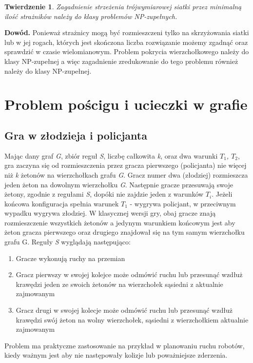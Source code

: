 \documentclass[brudnopis]{xmgr}
\newtheorem{Twierdzenie}{Twierdzenie}
\begin{document}
\begin{Twierdzenie}
	Zagadnienie strzeżenia trójwymiarowej siatki przez minimalną ilość strażników należy do klasy problemów NP-zupełnych.
\end{Twierdzenie}
\textbf{Dowód.} Ponieważ strażnicy mogą być rozmieszczeni tylko na skrzyżowania siatki lub w jej rogach, których jest skończona liczba rozwiązanie możemy zgadnąć oraz sprawdzić w czasie wielomianowym. Problem pokrycia wierzchołkowego należy do klasy NP-zupełnej a więc zagadnienie zredukowanie do tego problemu również należy do klasy NP-zupełnej.

\chapter{Problem pościgu i ucieczki w grafie}
\section{Gra w złodzieja i policjanta}
Mając dany graf \textit{G}, zbiór reguł \textit{S}, liczbę całkowita \textit{k}, oraz dwa warunki \textit{$T_1$, $T_2$}, gra zaczyna się od rozmieszczenia przez gracza pierwszego (policjanta) nie więcej niż \textit{k} żetonów na wierzchołkach grafu \textit{G}. Gracz numer dwa (złodziej) rozmieszcza jeden żeton na dowolnym wierzchołku \textit{G}. Następnie gracze przesuwają swoje żetony, zgodnie z regułami \textit{S}, dopóki nie zajdzie jeden z warunków $T_i$. Jeżeli końcowa konfiguracja spełnia warunek $T_1$ - wygrywa policjant, w przeciwnym wypadku wygrywa złodziej. W klasycznej wersji gry, obaj gracze znają rozmieszczenie wszystkich żetonów a jedynym warunkiem końcowym jest aby żeton gracza pierwszego oraz drugiego znajdował się na tym samym wierzchołku grafu G.
Reguły \textit{S} wyglądają następująco:
\begin{enumerate}
  \item Gracze wykonują ruchy na przemian
  \item Gracz pierwszy w swojej kolejce może odmówić ruchu lub przesunąć wzdłuż krawędzi jeden ze swoich żetonów na wierzchołek sąsiedni z aktualnie zajmowanym
  \item Gracz drugi w swojej kolecje może odmówić ruchu lub przesunąć wzdłuż krawędzi swój żeton na wolny wierzchołek, sąsiedni z wierzchołkiem aktualnie zajmowanym
\end{enumerate}

Problem ma praktyczne zastosowanie na przykład w planowaniu ruchu robotów, kiedy ważnym jest aby nie następowały kolizje lub poważniejsze zderzenia.
\end{document}
